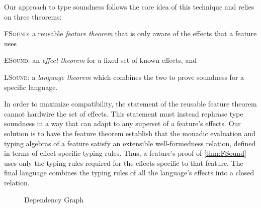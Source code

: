 Our approach to type soundness follows the core idea of this technique
and relies on three theorems:

{\addtolength{\leftskip}{5mm}
\noindent \hspace{-.25cm} \textsc{FSound}:
 a reusable \emph{feature theorem} that is only aware of the effects that
 a feature uses \par}

{\addtolength{\leftskip}{5mm}
\noindent \hspace{-.25cm} \textsc{ESound}:
 an \emph{effect theorem} for a fixed set of known effects, and \par}

{\addtolength{\leftskip}{5mm}
\noindent\hspace{-.25cm} \textsc{LSound}: a \emph{language theorem} which combines the two
to prove soundness for a specific language.
\par }

\noindent In order to maximize compatibility, the statement of the
reusable feature theorem cannot hardwire the set of effects. This
statement must instead rephrase type soundness in a way that can adapt
to any superset of a feature's effects. Our solution is to have the
feature theorem establish that the monadic evaluation and typing
algebras of a feature satisfy an extensible well-formedness relation,
defined in terms of effect-specific typing rules. Thus, a
feature's proof of \ref{thm:FSound} uses only the typing rules required
for the effects specific to that feature. The final language combines
the typing rules of all the language's effects into a closed relation.

\begin{figure}[t!]
\caption{Dependency Graph}
\label{fig:Dep-Graph}
\end{figure}


